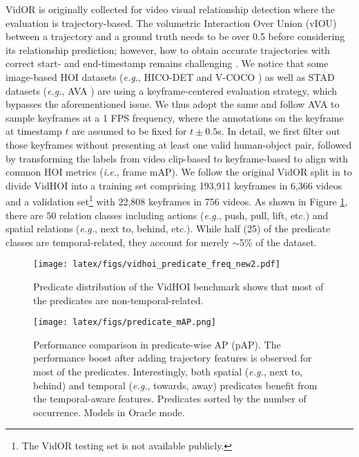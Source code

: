 \documentclass[sigconf]{acmart}
\begin{document}
VidOR is originally collected for video visual relationship detection where the evaluation is trajectory-based. The volumetric Interaction Over Union (vIOU) between a trajectory and a ground truth needs to be over 0.5 before considering its relationship prediction; however, how to obtain accurate trajectories with correct start- and end-timestamp remains challenging \cite{sun2019video,shang2017video}.
We notice that some image-based HOI datasets (\emph{e.g.}, HICO-DET \cite{chao2018learning} and V-COCO \cite{gupta2015visual}) as well as STAD datasets (\emph{e.g.}, AVA \cite{gu2018ava}) are using a keyframe-centered evaluation strategy, which bypasses the aforementioned issue.
We thus adopt the same and follow AVA to sample keyframes at a 1 FPS frequency, where the annotations on the keyframe at timestamp $t$ are assumed to be fixed for $t \pm 0.5$s. 
In detail, we first filter out those keyframes without presenting at least one valid human-object pair, followed by transforming the labels from video clip-based to keyframe-based to align with common HOI metrics (\emph{i.e.}, frame mAP).
We follow the original VidOR split in \cite{shang2019annotating} to divide VidHOI into a training set comprising 193,911 keyframes in 6,366 videos and a validation set\footnote{The VidOR testing set is not available publicly.} with 22,808 keyframes in 756 videos. 
As shown in Figure \ref{fig:pred_dist}, there are 50 relation classes including actions (\emph{e.g.}, {\selectfont push}, {\selectfont pull}, {\selectfont lift}, etc.) and spatial relations (\emph{e.g.}, {\selectfont next to}, {\selectfont behind}, etc.).
While half (25) of the predicate classes are temporal-related, they account for merely $\sim$5\% of the dataset.


\begin{figure}[t]
\begin{center}
\texttt{[image: latex/figs/vidhoi\_predicate\_freq\_new2.pdf]}
\end{center}
\vspace{-1.3em}
   \caption{Predicate distribution of the VidHOI benchmark shows that most of the predicates are non-temporal-related.}
\label{fig:pred_dist}
\vspace{-1.5em}
\end{figure}

\begin{figure*}[ht!]
\centering
\texttt{[image: latex/figs/predicate\_mAP.png]}
\vspace{-1.5em}
\caption{Performance comparison in predicate-wise AP (pAP).
The performance boost after adding trajectory features is observed for most of the predicates.
Interestingly, both spatial (\emph{e.g.}, {\selectfont next to}, {\selectfont behind}) and temporal (\emph{e.g.}, {\selectfont towards}, {\selectfont away}) predicates benefit from the temporal-aware features.
Predicates sorted by the number of occurrence.
Models in {\selectfont Oracle} mode.
}
\vspace{-1em}
\label{fig:predicate_map}
\end{figure*}
\end{document}
